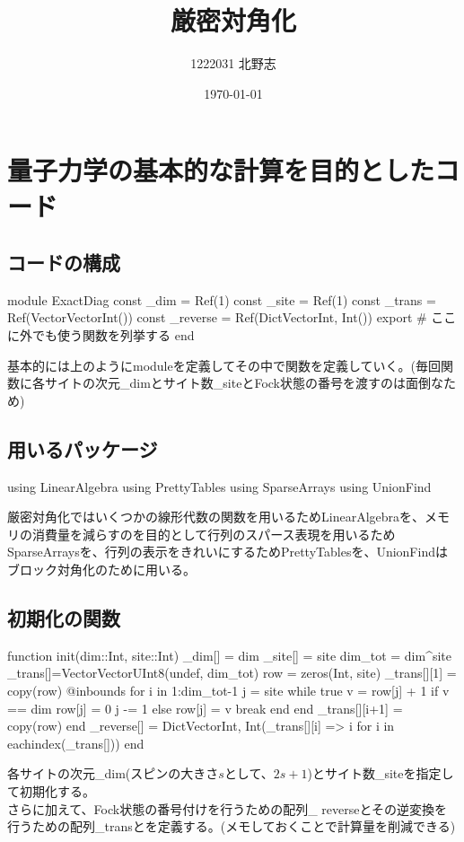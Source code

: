 \documentclass{ltjsarticle}
\title{厳密対角化}
\author{1222031 北野志}
\date{\today}
\begin{document}
\maketitle
\section{量子力学の基本的な計算を目的としたコード}
\subsection*{コードの構成}
\begin{jllisting}
module ExactDiag
const _dim = Ref(1)
const _site = Ref(1)
const _trans = Ref(Vector{Vector{Int}}())  
const _reverse = Ref(Dict{Vector{Int}, Int}()) 
export # ここに外でも使う関数を列挙する
end
\end{jllisting}
基本的には上のようにmoduleを定義してその中で関数を定義していく。(毎回関数に各サイトの次元\_dimとサイト数\_siteとFock状態の番号を渡すのは面倒なため)\\
\subsection*{用いるパッケージ}
\begin{jllisting}
using LinearAlgebra
using PrettyTables
using SparseArrays
using UnionFind
\end{jllisting}
厳密対角化ではいくつかの線形代数の関数を用いるためLinearAlgebraを、メモリの消費量を減らすのを目的として行列のスパース表現を用いるためSparseArraysを、行列の表示をきれいにするためPrettyTablesを、UnionFindはブロック対角化のために用いる。\\
\subsection*{初期化の関数}
\begin{jllisting}
function init(dim::Int, site::Int)
  _dim[] = dim
  _site[] = site
  dim_tot = dim^site
  _trans[]=Vector{Vector{UInt8}}(undef, dim_tot)
  row = zeros(Int, site)
  _trans[][1] = copy(row)
  @inbounds for i in 1:dim_tot-1
    j = site
    while true
      v = row[j] + 1
      if v == dim
        row[j] = 0
        j -= 1
      else
        row[j] = v
        break
      end
    end
    _trans[][i+1] = copy(row)
  end
  _reverse[] = Dict{Vector{Int}, Int}(_trans[][i] => i for i in eachindex(_trans[]))
end
\end{jllisting}
各サイトの次元\_dim(スピンの大きさ$s$として、$2s+1$)とサイト数\_siteを指定して初期化する。\\
さらに加えて、Fock状態の番号付けを行うための配列\_ reverseとその逆変換を行うための配列\_transとを定義する。(メモしておくことで計算量を削減できる)\\
\end{document}
